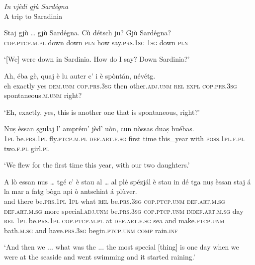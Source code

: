 \textit{In vjèdi gjù Sardégna}\\
A trip to Saradinia\\
\smallskip

\begin{linenumbers}
	\gll Staj gjù … gjù Sardégna. Cù détsch ju? Gjù Sardégna?\footnotemark{}\\
	\textsc{cop.ptcp.m.pl} down {} down \textsc{pln} how say.\textsc{prs.1sg} \textsc{1sg} down \textsc{pln}\\
\end{linenumbers}
\medskip
\glt `[We] were down in Sardinia. How do I say? Down Sardinia?'
\medskip

\begin{linenumbers}
	\gll Ah, éba gè, quaj è lu auter c’ i è spòntán, névétg.   \\
	eh exactly yes \textsc{dem.unm} \textsc{cop.prs.3sg} then other.\textsc{adj.unm} \textsc{rel} \textsc{expl} \textsc{cop.prs.3sg} spontaneous.\textsc{m.unm} right?\\ 
\end{linenumbers}
\medskip
\glt `Eh, exactly, yes, this is another one that is spontaneous, right?'
\medskip

\begin{linenumbers}
	\gll  Nuṣ èssan ṣgulaj l’ amprém’ jèd’ uòn, cun nòssas duaṣ buébas.\\
	\textsc{1pl} be.\textsc{prs.1pl} fly.\textsc{ptcp.m.pl} \textsc{def.art.f.sg} first time this\_year with \textsc{poss.1pl.f.pl} two.\textsc{f.pl} girl.\textsc{pl}\\
\end{linenumbers}
\medskip
\glt `We flew for the first time this year, with our two daughters.'
\medskip

\begin{linenumbers}
	\gll  A lò essan nus … tgé c’ è stau al … al plé spézjál è stau in dé tga nuṣ èssan staj á la mar a fatg bògn api ò antschiat á plùver.\\
	and there be.\textsc{prs.1pl} \textsc{1pl} {} what \textsc{rel} be.\textsc{prs.3sg} \textsc{cop.ptcp.unm} \textsc{def.art.m.sg} {} \textsc{def.art.m.sg} more special.\textsc{adj.unm} be.\textsc{prs.3sg} \textsc{cop.ptcp.unm} \textsc{indef.art.m.sg} day \textsc{rel} \textsc{1pl} be.\textsc{prs.1pl} \textsc{cop.ptcp.m.pl} at \textsc{def.art.f.sg} sea and make.\textsc{ptcp.unm} bath.\textsc{m.sg} and have.\textsc{prs.3sg} begin.\textsc{ptcp.unm} \textsc{comp} rain.\textsc{inf}\\
\end{linenumbers}
\medskip
\glt `And then we ... what was the ... the most special [thing] is one day when we were at the seaside and went swimming and it started raining.'
\medskip

